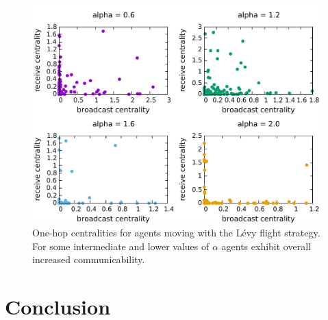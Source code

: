 \documentclass[conference]{IEEEtran}
\begin{document}
\begin{figure}
  \includegraphics[width=\columnwidth]{levy-onehop-comm.pdf}
  \caption{One-hop centralities for agents moving with the L\'evy
    flight strategy. For some intermediate and lower values of
    $\alpha$ agents exhibit overall increased communicability.}
  \label{fig:levy-comm}
\end{figure}

\section{Conclusion}

%
%
\end{document}
